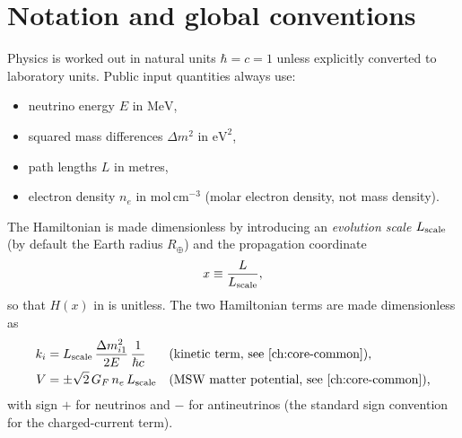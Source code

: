 \section{Notation and global conventions}
\label{sec:units}

\begin{theorybox}
Physics is worked out in natural units $\hbar = c = 1$ unless explicitly
converted to laboratory units. Public input quantities always use:
\begin{itemize}
  \item neutrino energy $E$ in $\mathrm{MeV}$,
  \item squared mass differences $\Delta m^2$ in $\mathrm{eV}^2$,
  \item path lengths $L$ in metres,
  \item electron density $n_e$ in $\mathrm{mol\,cm^{-3}}$ (molar electron
    density, not mass density).
\end{itemize}
The Hamiltonian is made dimensionless by introducing an \emph{evolution
scale} $L_{\rm scale}$ (by default the Earth radius $R_\oplus$) and the
propagation coordinate
\begin{equation}
  x \equiv \frac{L}{L_{\rm scale}},
\end{equation}
so that $H(x)$ in  is unitless. The two
Hamiltonian terms are made dimensionless as
\begin{align}
  k_i &= L_{\rm scale}\,\frac{\Delta m^2_{i1}}{2E}\,\frac{1}{\hbar c}
       &&\text{(kinetic term, see \cref{ch:core-common}),}\\
  V &= \pm\sqrt{2}\,G_F\, n_e\, L_{\rm scale}
       &&\text{(MSW matter potential, see \cref{ch:core-common}),}
\end{align}
with sign $+$ for neutrinos and $-$ for antineutrinos (the standard sign
convention for the charged-current term).
\end{theorybox}

